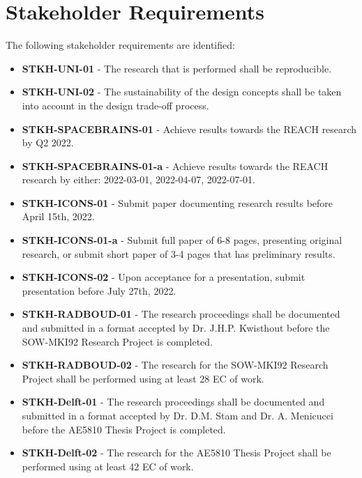 \section{Stakeholder Requirements}\label{sec:baseline_stakeholder_requirements}
The following stakeholder requirements are identified:
\begin{itemize}
    \item \textbf{STKH-UNI-01} - The research that is performed shall be reproducible.
    \item \textbf{STKH-UNI-02} - The sustainability of the design concepts shall be taken into account in the design trade-off process.
    \item \textbf{STKH-SPACEBRAINS-01} - Achieve results towards the REACH research by Q2 2022.
    \item \textbf{STKH-SPACEBRAINS-01-a} - Achieve results towards the REACH research by either: 2022-03-01, 2022-04-07, 2022-07-01.
    \item \textbf{STKH-ICONS-01} - Submit paper documenting research results before April 15th, 2022.
    \item \textbf{STKH-ICONS-01-a} - Submit full paper of 6-8 pages, presenting original research, or submit short paper of 3-4 pages that has preliminary results.
    \item \textbf{STKH-ICONS-02} - Upon acceptance for a presentation, submit presentation before July 27th, 2022.
    \item \textbf{STKH-RADBOUD-01} - The research proceedings shall be documented and submitted in a format accepted by Dr. J.H.P. Kwisthout before the SOW-MKI92 Research Project is completed.
    \item \textbf{STKH-RADBOUD-02} - The research for the SOW-MKI92 Research Project shall be performed using at least 28 EC of work.
    \item \textbf{STKH-Delft-01} - The research proceedings shall be documented and submitted in a format accepted by Dr. D.M. Stam and Dr. A. Menicucci before the AE5810 Thesis Project is completed.
    \item \textbf{STKH-Delft-02} - The research for the AE5810 Thesis Project shall be performed using at least 42 EC of work.
\end{itemize}

